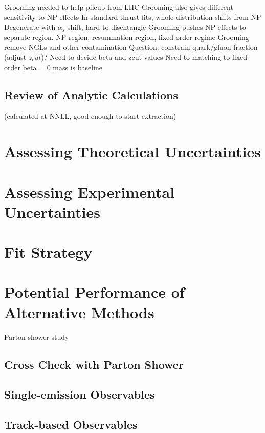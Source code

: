 \documentclass[11pt,letterpaper]{article}
\begin{document}
	Grooming needed to help pileup from LHC
	Grooming also gives different sensitivity to NP effects
		In standard thrust fits, whole distribution shifts from NP
		Degenerate with $\alpha_s$ shift, hard to disentangle
		Grooming pushes NP effects to separate region.
		NP region, resummation region, fixed order regime
	Grooming remove NGLs and other contamination
	Question:  constrain quark/gluon fraction (adjust $z_cut$)?
	Need to decide beta and zcut values
	Need to matching to fixed order
	beta = 0 mass is baseline


\subsection{Review of Analytic Calculations}

(calculated at NNLL, good enough to start extraction)

\section{Assessing Theoretical Uncertainties}

\section{Assessing Experimental Uncertainties}

\section{Fit Strategy}

\section{Potential Performance of Alternative Methods}

Parton shower study

\subsection{Cross Check with Parton Shower}

\subsection{Single-emission Observables}

\subsection{Track-based Observables}
\end{document}
